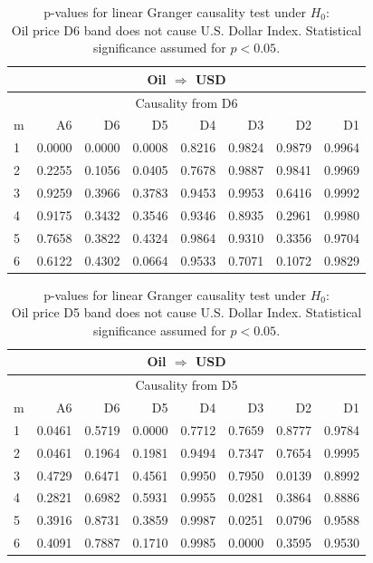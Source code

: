 %
%
\begin{table}[H]
\begin{center}
\begin{tabular}{l|r r r r r r r}
\hline\hline
\multicolumn{8}{c}{Oil $\Rightarrow$ USD}\\
\hline
\multicolumn{8}{c}{Causality from D6}\\
\hline\hline
m & A6 & D6 & D5 & D4 & D3 & D2 & D1 \\
\hline
1 & \cellcolor{mygrey}0.0000 & \cellcolor{mygrey}0.0000 & \cellcolor{mygrey}0.0008 & 0.8216 & 0.9824 & 0.9879 & 0.9964 \\
2 & 0.2255 & 0.1056 & \cellcolor{mygrey}0.0405 & 0.7678 & 0.9887 & 0.9841 & 0.9969 \\
3 & 0.9259 & 0.3966 & 0.3783 & 0.9453 & 0.9953 & 0.6416 & 0.9992 \\
4 & 0.9175 & 0.3432 & 0.3546 & 0.9346 & 0.8935 & 0.2961 & 0.9980 \\
5 & 0.7658 & 0.3822 & 0.4324 & 0.9864 & 0.9310 & 0.3356 & 0.9704 \\
6 & 0.6122 & 0.4302 & 0.0664 & 0.9533 & 0.7071 & 0.1072 & 0.9829 \\
\hline\hline
\end{tabular}
\caption{p-values for linear Granger causality test under $H_0$:\\
Oil price D6 band does not cause U.S. Dollar Index. Statistical significance assumed for $p<0.05$.}
\end{center}
\end{table}

%
%
\begin{table}[H]
\begin{center}
\begin{tabular}{l|r r r r r r r}
\hline\hline
\multicolumn{8}{c}{Oil $\Rightarrow$ USD}\\
\hline
\multicolumn{8}{c}{Causality from D5}\\
\hline\hline
m & A6 & D6 & D5 & D4 & D3 & D2 & D1 \\
\hline
1 & \cellcolor{mygrey}0.0461 & 0.5719 & \cellcolor{mygrey}0.0000 & 0.7712 & 0.7659 & 0.8777 & 0.9784 \\
2 & \cellcolor{mygrey}0.0461 & 0.1964 & 0.1981 & 0.9494 & 0.7347 & 0.7654 & 0.9995 \\
3 & 0.4729 & 0.6471 & 0.4561 & 0.9950 & 0.7950 & \cellcolor{mygrey}0.0139 & 0.8992 \\
4 & 0.2821 & 0.6982 & 0.5931 & 0.9955 & \cellcolor{mygrey}0.0281 & 0.3864 & 0.8886 \\
5 & 0.3916 & 0.8731 & 0.3859 & 0.9987 & \cellcolor{mygrey}0.0251 & 0.0796 & 0.9588 \\
6 & 0.4091 & 0.7887 & 0.1710 & 0.9985 & \cellcolor{mygrey}0.0000 & 0.3595 & 0.9530 \\
\hline\hline
\end{tabular}
\caption{p-values for linear Granger causality test under $H_0$:\\
Oil price D5 band does not cause U.S. Dollar Index. Statistical significance assumed for $p<0.05$.}
\end{center}
\end{table}

